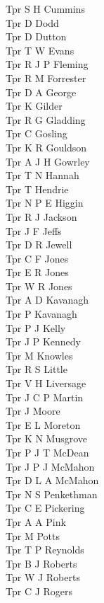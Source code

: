 \begin{multicols}{3}
  Tpr S H Cummins \\
  Tpr D Dodd \\
  Tpr D Dutton \\
  Tpr T W Evans \\
  Tpr R J P Fleming \\
  Tpr R M Forrester \\
  Tpr D A George \\
  Tpr K Gilder \\
  Tpr R G Gladding \\
  Tpr C Gosling \\
  Tpr K R Gouldson \\
  Tpr A J H Gowrley \\
  Tpr T N Hannah \\
  Tpr T Hendrie \\
  Tpr N P E Higgin \\
  Tpr R J Jackson \\
  Tpr J F Jeffs \\
  Tpr D R Jewell \\
  Tpr C F Jones \\
  Tpr E R Jones \\
  Tpr W R Jones \\
  Tpr A D Kavanagh \\
  Tpr P Kavanagh \\
  Tpr P J Kelly \\
  Tpr J P Kennedy \\
  Tpr M Knowles \\
  Tpr R S Little \\
  Tpr V H Liversage \\
  Tpr J C P Martin \\
  Tpr J Moore \\
  Tpr E L Moreton \\
  Tpr K N Musgrove \\
  Tpr P J T McDean \\
  Tpr J P J McMahon \\
  Tpr D L A McMahon \\
  Tpr N S Penkethman \\
  Tpr C E Pickering \\
  Tpr A A Pink \\
  Tpr M Potts \\
  Tpr T P Reynolds \\
  Tpr B J Roberts \\
  Tpr W J Roberts \\
  Tpr C J Rogers \\

\end{multicols}
